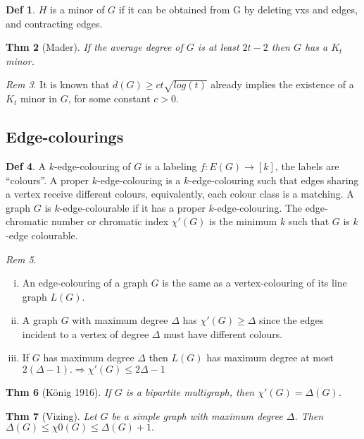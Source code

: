 \documentclass[11pt, fleqn, a4paper, landscape]{article}
\theoremstyle{plain} %
\newtheorem{thm}{Thm}
\theoremstyle{remark} %
\newtheorem{rem}[thm]{Rem}
\theoremstyle{definition} %
\newtheorem{defi}[thm]{Def}
\begin{document}
\begin{multicols}{5}
\begin{defi}
$H$ is a minor of $G$ if it can be obtained from G by deleting vxs and edges, and contracting edges.
\end{defi}
\addtocounter{thm}{2}
\begin{thm}[Mader]
If the average degree of $G$ is at least $2t-2$ then $G$ has a $K_t$ minor.
\end{thm}

\begin{rem}
It is known that $\overline{d}(G) \ge ct\sqrt{log(t)}$ already implies the existence of a $K_t$ minor in $G$, for some constant $c > 0$.
\end{rem}
\subsection{Edge-colourings}
\begin{defi}
A $k$-edge-colouring of $G$ is a labeling $f : E(G) \to [k]$, the labels are “colours”. A proper $k$-edge-colouring is a $k$-edge-colouring such that edges sharing a vertex receive different colours, equivalently, each colour class is a matching. A graph $G$ is $k$-edge-colourable if it has a
proper $k$-edge-colouring. The edge-chromatic number or chromatic index $\chi'(G)$ is the minimum $k$ such that $G$ is $k$-edge colourable.
\end{defi}

\begin{rem}
\begin{enumerate}[(i)]
\item An edge-colouring of a graph $G$ is the same as a vertex-colouring of its line graph $L(G)$.
\item A graph $G$ with maximum degree $\Delta$ has $\chi'(G) \ge \Delta$ since the edges incident to a vertex of degree $\Delta$ must have different colours.
\item If $G$ has maximum degree $\Delta$ then $L(G)$ has maximum degree at most $2(\Delta-1).\Rightarrow \chi'(G) \le 2\Delta - 1$ 
\end{enumerate}
\end{rem}

\begin{thm}[König 1916]
If $G$ is a bipartite multigraph, then $\chi'(G) = \Delta(G)$.
\end{thm}

\begin{thm}[Vizing]
Let $G$ be a simple graph with maximum degree $\Delta$. Then $\Delta(G)\le \chi0(G) \le \Delta(G) + 1.$
\end{thm}
\addtocounter{thm}{1}


\end{multicols}
\end{document}
